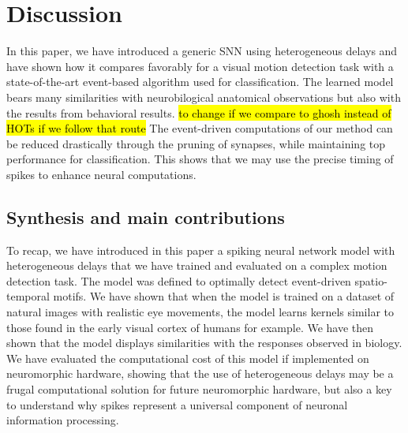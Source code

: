 \documentclass[default]{sn-jnl}%
\theoremstyle{thmstyleone}%
\theoremstyle{thmstyletwo}%
\theoremstyle{thmstylethree}%
\newcommand{\note}[1]{{\sethlcolor{yellow}\hl{#1}}}
\begin{document}
%
\section{Discussion}
In this paper, we have introduced a generic SNN using heterogeneous delays and have shown how it compares favorably for a visual motion detection task with a state-of-the-art event-based algorithm used for classification. The learned model bears many similarities with neurobilogical anatomical observations but also with the results from behavioral results. \note{to change if we compare to ghosh instead of HOTs if we follow that route} The event-driven computations of our method can be reduced drastically through the pruning of synapses, while maintaining top performance for classification. This shows that we may use the precise timing of spikes to enhance neural computations. 
%
\subsection{Synthesis and main contributions}
To recap, we have introduced in this paper a spiking neural network model with heterogeneous delays that we have trained and evaluated on a complex motion detection task. The model was defined to optimally detect event-driven spatio-temporal motifs. We have shown that when the model is trained on a dataset of natural images with realistic eye movements, the model learns kernels similar to those found in the early visual cortex of humans for example. We have then shown that the model displays similarities with the responses observed in biology. We have evaluated the computational cost of this model if implemented on neuromorphic hardware, showing that the use of heterogeneous delays may be a frugal computational solution for future neuromorphic hardware, but also a key to understand why spikes represent a universal component of neuronal information processing.
\end{document}
